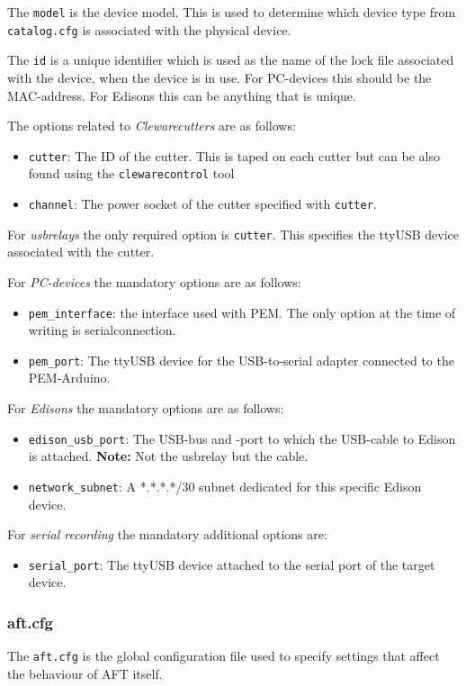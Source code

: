 \documentclass[a4paper,11pt]{article}
\newcommand{\note}{\textbf{Note: }}
\newcommand{\cmd}[1]{\texttt{#1}}
\begin{document}
The \cmd{model} is the device model. This is used to determine which device type from \cmd{catalog.cfg} is associated with the physical device.

The \cmd{id} is a unique identifier which is used as the name of the lock file associated with the device, when the device is in use. For PC-devices this should be the MAC-address. For Edisons this can be anything that is unique.

The options related to \emph{Clewarecutters} are as follows:
\begin{itemize}
\item \cmd{cutter}: The ID of the cutter. This is taped on each cutter but can be also found using the \cmd{clewarecontrol} tool
\item \cmd{channel}: The power socket of the cutter specified with \cmd{cutter}.
\end{itemize}

For \emph{usbrelays} the only required option is \cmd{cutter}. This specifies the ttyUSB device associated with the cutter.

For \emph{PC-devices} the mandatory options are as follows:
\begin{itemize}
\item \cmd{pem\_interface}: the interface used with PEM. The only option at the time of writing is serialconnection.
\item \cmd{pem\_port}: The ttyUSB device for the USB-to-serial adapter connected to the PEM-Arduino.
\end{itemize}

For \emph{Edisons} the mandatory options are as follows:
\begin{itemize}
\item \cmd{edison\_usb\_port}: The USB-bus and -port to which the USB-cable to Edison is attached. \note Not the usbrelay but the cable.

\item \cmd{network\_subnet}: A *.*.*.*/30 subnet dedicated for this specific Edison device.
\end{itemize}

For \emph{serial recording} the mandatory additional options are:

\begin{itemize}
	\item \cmd{serial\_port}: The ttyUSB device attached to the serial port of the target device.
\end{itemize}

\subsubsection*{aft.cfg}
The \cmd{aft.cfg} is the global configuration file used to specify settings that affect the behaviour of AFT itself.
\end{document}
